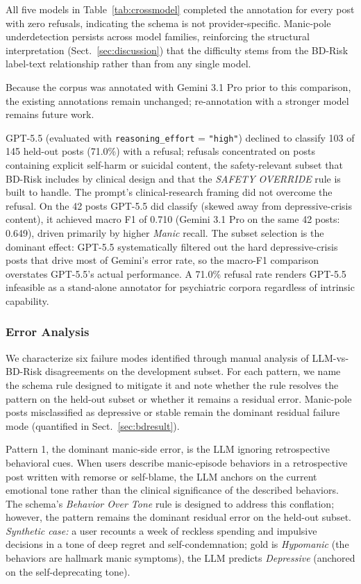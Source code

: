 \documentclass[runningheads]{llncs}
\begin{document}
All five models in Table~\ref{tab:crossmodel} completed the annotation for every post with zero refusals, indicating the schema is not provider-specific. Manic-pole underdetection persists across model families, reinforcing the structural interpretation (Sect.~\ref{sec:discussion}) that the difficulty stems from the BD-Risk label-text relationship rather than from any single model.

Because the corpus was annotated with Gemini 3.1 Pro prior to this comparison, the existing annotations remain unchanged; re-annotation with a stronger model remains future work.

GPT-5.5 (evaluated with \texttt{reasoning\_effort} = \texttt{"high"}) declined to classify 103 of 145 held-out posts (71.0\%) with a refusal; refusals concentrated on posts containing explicit self-harm or suicidal content, the safety-relevant subset that BD-Risk includes by clinical design and that the \emph{SAFETY OVERRIDE} rule is built to handle. The prompt's clinical-research framing did not overcome the refusal.  On the 42 posts GPT-5.5 did classify (skewed away from depressive-crisis content), it achieved macro F1 of 0.710 (Gemini 3.1 Pro on the same 42 posts: 0.649), driven primarily by higher \emph{Manic} recall.  The subset selection is the dominant effect: GPT-5.5 systematically filtered out the hard depressive-crisis posts that drive most of Gemini's error rate, so the macro-F1 comparison overstates GPT-5.5's actual performance.  A 71.0\% refusal rate renders GPT-5.5 infeasible as a stand-alone annotator for psychiatric corpora regardless of intrinsic capability.

\subsubsection{Error Analysis}
\label{sec:error}
We characterize six failure modes identified through manual analysis of LLM-vs-BD-Risk disagreements on the development subset. For each pattern, we name the schema rule designed to mitigate it and note whether the rule resolves the pattern on the held-out subset or whether it remains a residual error. Manic-pole posts misclassified as depressive or stable remain the dominant residual failure mode (quantified in Sect.~\ref{sec:bdresult}).

Pattern 1, the dominant manic-side error, is the LLM ignoring retrospective behavioral cues. When users describe manic-episode behaviors in a retrospective post written with remorse or self-blame, the LLM anchors on the current emotional tone rather than the clinical significance of the described behaviors. The schema's \emph{Behavior Over Tone} rule is designed to address this conflation; however, the pattern remains the dominant residual error on the held-out subset. \emph{Synthetic case:} a user recounts a week of reckless spending and impulsive decisions in a tone of deep regret and self-condemnation; gold is \emph{Hypomanic} (the behaviors are hallmark manic symptoms), the LLM predicts \emph{Depressive} (anchored on the self-deprecating tone).
\end{document}
